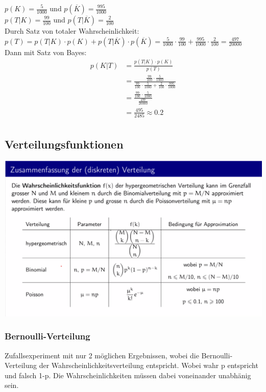 \documentclass[12pt]{scrartcl}
\begin{document}
$p(K) = \frac{5}{1000}$ und $p(\overline{K}) = \frac{995}{1000}$\\
$p(T|K) = \frac{99}{100}$ und $p(T|\overline{K}) = \frac{2}{100}$\\

Durch Satz von totaler Wahrscheinlichkeit:\\
$p(T) = p(T|K) \cdot p(K) + p(T|\overline{K}) \cdot p(\overline{K}) = \frac{5}{1000} \cdot \frac{99}{100} + \frac{995}{1000} \cdot \frac{2}{100} = \frac{497}{20000}$\\


Dann mit Satz von Bayes:\\
\begin{align*}
 p(K|T) &= \frac{p(T|K) \cdot p(K)}{p(T)} \\
        &= \frac{\frac{99}{100} \cdot \frac{5}{1000}}{\frac{99}{100} \cdot \frac{5}{1000} + \frac{2}{100} \cdot \frac{995}{1000}} \\
        &= \frac{\frac{99}{100} \cdot \frac{5}{1000}}{\frac{497}{20000}} \\
        &= \frac{495}{2485} \approx 0.2\\
\end{align*}

\newpage
\subsection{Verteilungsfunktionen}

\vspace{0.5cm}
\includegraphics[width=15cm]{img/zusammenfassung _verteilungen.png}

\subsubsection{Bernoulli-Verteilung}
Zufallsexperiment mit nur 2 möglichen Ergebnissen, wobei die Bernoulli-Verteilung der 
Wahrscheinlichkeitsverteilung entspricht. Wobei wahr p entspricht und falsch 1-p.
Die Wahrscheinlichkeiten müssen dabei voneinander unabhänig sein.\\
\end{document}
